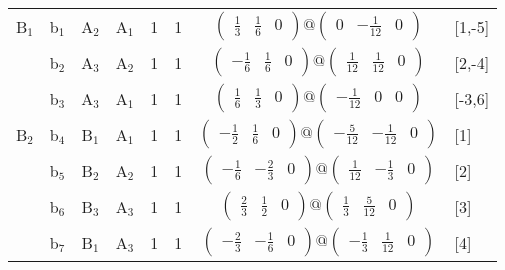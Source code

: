 \documentclass[fleqn,10pt,landscape]{article}
\begin{document}
\begin{itemize}
\begin{center}
\begin{longtable}{cc|cc|c|c|c|l}
B$_{1}$ & b$_{1}$ & A$_{2}$ & A$_{1}$ & 1 & 1 & $\begin{pmatrix} \frac{1}{3} & \frac{1}{6} & 0 \end{pmatrix}@\begin{pmatrix} 0 & - \frac{1}{12} & 0 \end{pmatrix}$ & [1,-5] \\
& b$_{2}$ & A$_{3}$ & A$_{2}$ & 1 & 1 & $\begin{pmatrix} - \frac{1}{6} & \frac{1}{6} & 0 \end{pmatrix}@\begin{pmatrix} \frac{1}{12} & \frac{1}{12} & 0 \end{pmatrix}$ & [2,-4] \\
& b$_{3}$ & A$_{3}$ & A$_{1}$ & 1 & 1 & $\begin{pmatrix} \frac{1}{6} & \frac{1}{3} & 0 \end{pmatrix}@\begin{pmatrix} - \frac{1}{12} & 0 & 0 \end{pmatrix}$ & [-3,6] \\ \hline
B$_{2}$ & b$_{4}$ & B$_{1}$ & A$_{1}$ & 1 & 1 & $\begin{pmatrix} - \frac{1}{2} & \frac{1}{6} & 0 \end{pmatrix}@\begin{pmatrix} - \frac{5}{12} & - \frac{1}{12} & 0 \end{pmatrix}$ & [1] \\
& b$_{5}$ & B$_{2}$ & A$_{2}$ & 1 & 1 & $\begin{pmatrix} - \frac{1}{6} & - \frac{2}{3} & 0 \end{pmatrix}@\begin{pmatrix} \frac{1}{12} & - \frac{1}{3} & 0 \end{pmatrix}$ & [2] \\
& b$_{6}$ & B$_{3}$ & A$_{3}$ & 1 & 1 & $\begin{pmatrix} \frac{2}{3} & \frac{1}{2} & 0 \end{pmatrix}@\begin{pmatrix} \frac{1}{3} & \frac{5}{12} & 0 \end{pmatrix}$ & [3] \\
& b$_{7}$ & B$_{1}$ & A$_{3}$ & 1 & 1 & $\begin{pmatrix} - \frac{2}{3} & - \frac{1}{6} & 0 \end{pmatrix}@\begin{pmatrix} - \frac{1}{3} & \frac{1}{12} & 0 \end{pmatrix}$ & [4] \\

\end{longtable}
\end{center}
\end{itemize}
\end{document}
